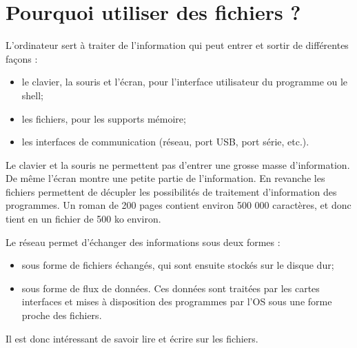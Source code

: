 \documentclass[10pt,fleqn]{article} %
\begin{document}


\section{Pourquoi utiliser des fichiers ?}

L'ordinateur sert à traiter de l'information qui peut entrer et sortir de différentes façons :
\begin{itemize}
\item le clavier, la souris et l'écran, pour l'interface utilisateur du programme ou le shell;
\item les fichiers, pour les supports mémoire;
\item les interfaces de communication (réseau, port USB, port série, etc.).
\end{itemize}

Le clavier et la souris ne permettent pas d'entrer une grosse masse d'information. De même l'écran montre une petite partie de l'information.
En revanche les fichiers permettent de décupler les possibilités de traitement d'information des programmes. Un roman de 200 pages contient environ 500 000 caractères, et donc tient en un fichier de 500 ko environ. 

Le réseau permet d'échanger des informations sous deux formes :
\begin{itemize}
\item sous forme de fichiers échangés, qui sont ensuite stockés sur le disque dur;
\item sous forme de flux de données. Ces données sont traitées par les cartes interfaces et mises à disposition des programmes par l'OS sous une forme proche des fichiers.
\end{itemize}
Il est donc intéressant de savoir lire et écrire sur les fichiers. 
\end{document}

